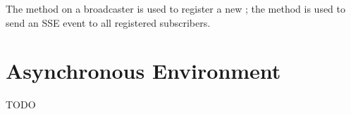 The  method on a broadcaster is used to register a new ; the
 method is used to send an SSE event to all registered subscribers.

\section{Asynchronous Environment}
\label{sse_async_environment}

TODO 


